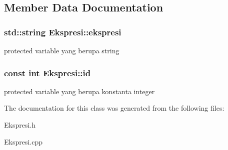\subsection{Member Data Documentation}
\hypertarget{class_ekspresi_a9d5082854ad50d47e63eb1bf4e263a3a}{}
\subsubsection[{ekspresi}]{\setlength{\rightskip}{0pt plus 5cm}std\+::string Ekspresi\+::ekspresi\hspace{0.3cm}{\ttfamily [protected]}}\label{class_ekspresi_a9d5082854ad50d47e63eb1bf4e263a3a}
protected variable yang berupa string \hypertarget{class_ekspresi_a7f5e4a40d4388ce071287e2f961c2ff1}{}
\subsubsection[{id}]{\setlength{\rightskip}{0pt plus 5cm}const int Ekspresi\+::id\hspace{0.3cm}{\ttfamily [protected]}}\label{class_ekspresi_a7f5e4a40d4388ce071287e2f961c2ff1}
protected variable yang berupa konstanta integer 

The documentation for this class was generated from the following files\+:\begin{DoxyCompactItemize}
\item 
Ekspresi.\+h\item 
Ekspresi.\+cpp\end{DoxyCompactItemize}
